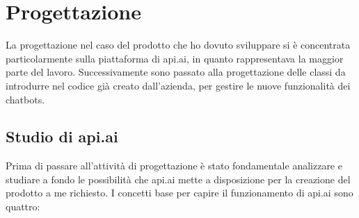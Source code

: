 
\chapter{Progettazione}
\label{cap:progettazione}

La progettazione nel caso del prodotto che ho dovuto sviluppare si è concentrata particolarmente sulla piattaforma di api.ai, in quanto rappresentava la maggior parte del lavoro. Successivamente sono passato alla progettazione delle classi da introdurre nel codice già creato dall'azienda, per gestire le nuove funzionalità dei \glspl{chatbot}.

\section{Studio di api.ai}
Prima di passare all'attività di progettazione è stato fondamentale analizzare e studiare a fondo le possibilità che api.ai mette a disposizione per la creazione del prodotto a me richiesto. I concetti base per capire il funzionamento di api.ai sono quattro:
